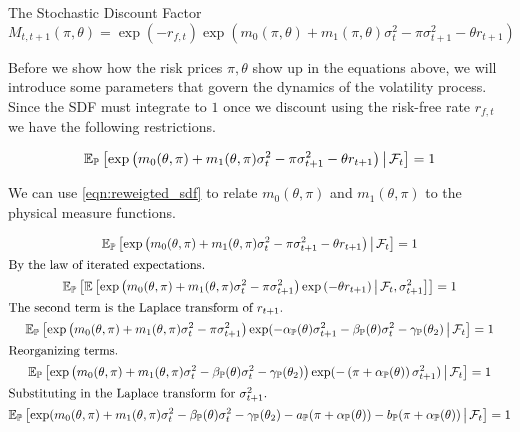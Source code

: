 \documentclass[11pt, letterpaper, twoside, final]{article}
\begin{document}
\begin{defn}{The Stochastic Discount Factor}
    \begin{equation}
        M_{t,t+1}(\pi, \theta) = \exp\left(-r_{f,t}\right) \exp\left(m_{0}(\pi, \theta) + m_1(\pi, \theta)
        \sigma_t^2 - \pi \sigma^2_{t+1} - \theta r_{t+1}\right) 
    \end{equation}
\end{defn}


Before we show how the risk prices $\pi, \theta$ show up in the equations above, we will introduce some parameters
that govern the dynamics of the volatility process.
Since the SDF must integrate to $1$ once we discount using the risk-free rate $r_{f,t}$\, we have the following
restrictions.

\begin{equation}
    \label{eqn:reweigted_sdf}
    \operatorname{\mathbb{E}}_{\mathbb{P}}\left[\exp\left(m_0(\theta, \pi) + m_1(\theta, \pi) \sigma^2_t - \pi \sigma^2_{t+1} - \theta r_{t+1}
    \right) \,\middle\vert\, \mathcal{F}_t \right] = 1 \\
\end{equation}

We can use \cref{eqn:reweigted_sdf} to relate $m_0(\theta, \pi)$ and $m_1(\theta, \pi)$ to the physical measure
functions. 

\begin{gather}
    \operatorname{\mathbb{E}}_{\mathbb{P}}\left[\exp\left(m_0(\theta, \pi) + m_1(\theta, \pi) \sigma^2_t - \pi \sigma^2_{t+1} - \theta r_{t+1}
    \right) \,\middle\vert\, \mathcal{F}_t \right] = 1 \\
    \intertext{By the law of iterated expectations.}
    \operatorname{\mathbb{E}}_{\mathbb{P}}\left[ \operatorname{\mathbb{E}}\left[\exp\left(m_0(\theta, \pi) + m_1(\theta, \pi) \sigma^2_t - \pi \sigma^2_{t+1}\right)
        \exp\left( - \theta r_{t+1}\right) \,\middle\vert\, \mathcal{F}_t, \sigma^2_{t+1} \right]\right] = 1 \\
    \intertext{The second term is the Laplace transform of $r_{t+1}$.}
    \operatorname{\mathbb{E}}_{\mathbb{P}}\left[\exp\left(m_0(\theta, \pi) + m_1(\theta, \pi) \sigma^2_t - \pi \sigma^2_{t+1} \right)
        \exp(-\alpha_{\mathbb{P}}(\theta) \sigma^2_{t+1} - \beta_{\mathbb{P}}(\theta) \sigma^2_{t} - \gamma_{\mathbb{P}}(\theta_2)
        \,\middle\vert\, \mathcal{F}_t \right] = 1 \\
    \intertext{Reorganizing terms.}
    \operatorname{\mathbb{E}}_{\mathbb{P}}\left[\exp\left(m_0(\theta, \pi) + m_1(\theta, \pi) \sigma^2_t - \beta_{\mathbb{P}}(\theta) \sigma^2_{t} -
        \gamma_{\mathbb{P}}(\theta_2) \right) \exp(-\left(\pi + \alpha_{\mathbb{P}}(\theta)\right) \sigma^2_{t+1}) \,\middle\vert\, \mathcal{F}_t
        \right] = 1 \\ 
    \intertext{Substituting in the Laplace transform for $\sigma^2_{t+1}$.} 
    \label{eqn:expected_sdf_wrt_PP}
    \operatorname{\mathbb{E}}_{\mathbb{P}}\left[\exp(m_0(\theta, \pi) + m_1(\theta, \pi) \sigma^2_t - \beta_{\mathbb{P}}(\theta) \sigma^2_{t} -
        \gamma_{\mathbb{P}}(\theta_2)  - a_{\mathbb{P}}(\pi + \alpha_{\mathbb{P}}(\theta)) - b_{\mathbb{P}}(\pi + \alpha_{\mathbb{P}}(\theta))
        \,\middle\vert\, \mathcal{F}_t \right] = 1 
\end{gather}
\end{document}
